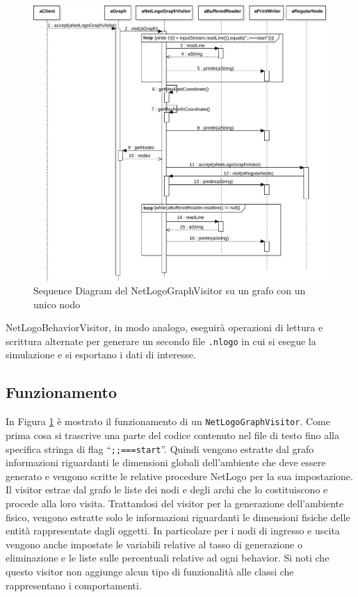 \begin{figure}[htbp]
\centering
\includegraphics[width=\textwidth,height=\textheight,keepaspectratio]{images/visitor-sequence.pdf}
\caption{Sequence Diagram del NetLogoGraphVisitor su un grafo con un unico nodo}
\label{fig:visitor-sequence}
\end{figure}
NetLogoBehaviorVisitor, in modo analogo, eseguirà operazioni di lettura e scrittura alternate per generare un secondo file \texttt{.nlogo} in cui si esegue la simulazione e si esportano i dati di interesse.

\subsection{Funzionamento}

In Figura \ref{fig:visitor-sequence} è mostrato il funzionamento di un \texttt{NetLogoGraphVisitor}. Come prima cosa si trascrive una parte del codice contenuto nel file di testo fino alla specifica stringa di flag “\texttt{;;===start}”. Quindi vengono estratte dal grafo informazioni riguardanti le dimensioni globali dell'ambiente che deve essere generato e vengono scritte le relative procedure NetLogo per la sua impostazione. Il visitor estrae dal grafo le liste dei nodi e degli archi che lo costituiscono e procede alla loro visita. Trattandosi del visitor per la generazione dell'ambiente fisico, vengono estratte solo le informazioni riguardanti le dimensioni fisiche delle entità rappresentate dagli oggetti. In particolare per i nodi di ingresso e uscita vengono anche impostate le variabili relative al tasso di generazione o eliminazione e le liste sulle percentuali relative ad ogni behavior. Si noti che questo visitor non aggiunge alcun tipo di funzionalità alle classi che rappresentano i comportamenti.

